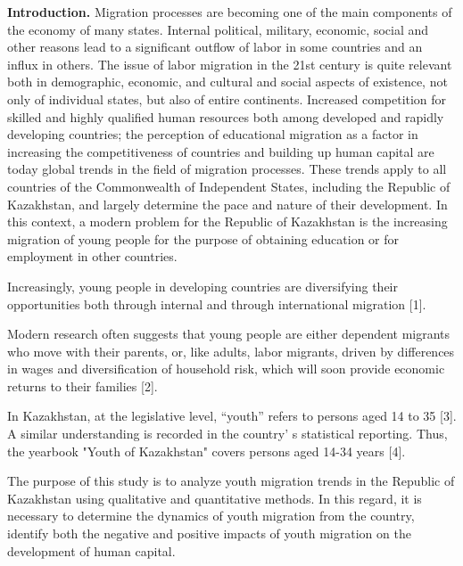 \begin{multicols}{2}
{\bfseries Introduction.} Migration processes are becoming one of the main
components of the economy of many states. Internal political, military,
economic, social and other reasons lead to a significant outflow of
labor in some countries and an influx in others. The issue of labor
migration in the 21st century is quite relevant both in demographic,
economic, and cultural and social aspects of existence, not only of
individual states, but also of entire continents. Increased competition
for skilled and highly qualified human resources both among developed
and rapidly developing countries; the perception of educational
migration as a factor in increasing the competitiveness of countries and
building up human capital are today global trends in the field of
migration processes. These trends apply to all countries of the
Commonwealth of Independent States, including the Republic of
Kazakhstan, and largely determine the pace and nature of their
development. In this context, a modern problem for the Republic of
Kazakhstan is the increasing migration of young people for the purpose
of obtaining education or for employment in other countries.

Increasingly, young people in developing countries are diversifying
their opportunities both through internal and through international
migration {[}1{]}.

Modern research often suggests that young people are either dependent
migrants who move with their parents, or, like adults, labor migrants,
driven by differences in wages and diversification of household risk,
which will soon provide economic returns to their families {[}2{]}.

In Kazakhstan, at the legislative level, ``youth'' refers to persons
aged 14 to 35 {[}3{]}. A similar understanding is recorded in the
country' s statistical reporting. Thus, the yearbook
"Youth of Kazakhstan" covers persons aged 14-34 years {[}4{]}.

The purpose of this study is to analyze youth migration trends in the
Republic of Kazakhstan using qualitative and quantitative methods. In
this regard, it is necessary to determine the dynamics of youth
migration from the country, identify both the negative and positive
impacts of youth migration on the development of human capital.


\end{multicols}
